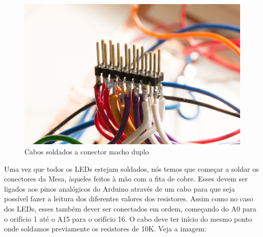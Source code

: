 \documentclass[paper=a4, fontsize=11pt]{scrartcl} %
\numberwithin{equation}{section} %
\numberwithin{figure}{section} %
\numberwithin{table}{section} %
\begin{document}
\begin{figure}[h!] %
  \centering
  \includegraphics[scale=0.10]{./imagens/diy-docs-4.jpg}
  \caption[ ]{Cabos soldados a conector macho duplo }
  \label{fig:cabos com conector}
\end{figure}

Uma vez que todos os LEDs estejam soldados, nós temos que começar a soldar os conectores da Mesa, àqueles feitos à mão com a fita de cobre. Esses devem ser ligados aos pinos analógicos do Arduino através de um cabo para que seja possível fazer a leitura dos diferentes valores dos resistores. Assim como no caso dos LEDs, esses também dever ser conectados em ordem, começando do A0 para o orifício 1 até o A15 para o orifício 16. O cabo deve ter início do mesmo ponto onde soldamos previamente os resistores de 10K. Veja a imagem:
\end{document}

